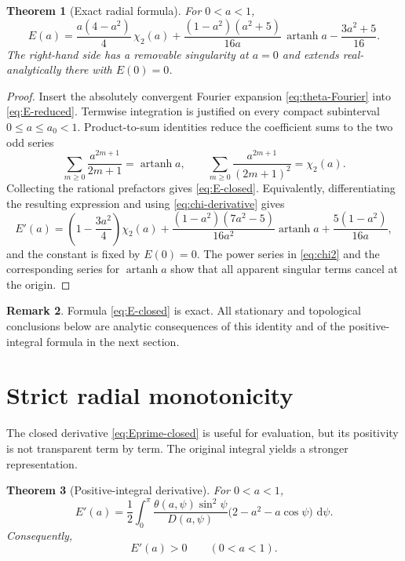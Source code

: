 \documentclass[11pt]{article}
\newtheorem{theorem}{Theorem}[section]
\theoremstyle{definition}
\newtheorem{remark}[theorem]{Remark}
\newcommand{\atanh}{\operatorname{artanh}}
\newcommand{\dd}{\,\mathrm{d}}
\begin{document}
\begin{theorem}[Exact radial formula]
For $0<a<1$,
\begin{equation}
\boxed{
E(a)
=
\frac{a(4-a^2)}{4}\,\chi_2(a)
+
\frac{(1-a^2)(a^2+5)}{16a}\,\atanh a
-
\frac{3a^2+5}{16}.
}
\label{eq:E-closed}
\end{equation}
The right-hand side has a removable singularity at $a=0$ and extends real-analytically there with $E(0)=0$.
\end{theorem}

\begin{proof}
Insert the absolutely convergent Fourier expansion \eqref{eq:theta-Fourier} into \eqref{eq:E-reduced}.  Termwise integration is justified on every compact subinterval $0\leq a\leq a_0<1$.  Product-to-sum identities reduce the coefficient sums to the two odd series
\[
\sum_{m\geq0}\frac{a^{2m+1}}{2m+1}=\atanh a,
\qquad
\sum_{m\geq0}\frac{a^{2m+1}}{(2m+1)^2}=\chi_2(a).
\]
Collecting the rational prefactors gives \eqref{eq:E-closed}.  Equivalently, differentiating the resulting expression and using \eqref{eq:chi-derivative} gives
\begin{equation}
E'(a)
=
\left(1-\frac{3a^2}{4}\right)\chi_2(a)
+
\frac{(1-a^2)(7a^2-5)}{16a^2}\atanh a
+
\frac{5(1-a^2)}{16a},
\label{eq:Eprime-closed}
\end{equation}
and the constant is fixed by $E(0)=0$.  The power series in \eqref{eq:chi2} and the corresponding series for $\atanh a$ show that all apparent singular terms cancel at the origin.
\end{proof}

\begin{remark}
Formula \eqref{eq:E-closed} is exact.  All stationary and topological conclusions below are analytic consequences of this identity and of the positive-integral formula in the next section.
\end{remark}

\section{Strict radial monotonicity}

The closed derivative \eqref{eq:Eprime-closed} is useful for evaluation, but its positivity is not transparent term by term.  The original integral yields a stronger representation.

\begin{theorem}[Positive-integral derivative]
For $0<a<1$,
\begin{equation}
\boxed{
E'(a)
=
\frac12\int_0^\pi
\frac{\theta(a,\psi)\sin^2\psi}{D(a,\psi)}
\bigl(2-a^2-a\cos\psi\bigr)\,\dd\psi.
}
\label{eq:Eprime-positive}
\end{equation}
Consequently,
\begin{equation}
E'(a)>0\qquad(0<a<1).
\label{eq:strict-monotonicity}
\end{equation}
\end{theorem}
\end{document}
